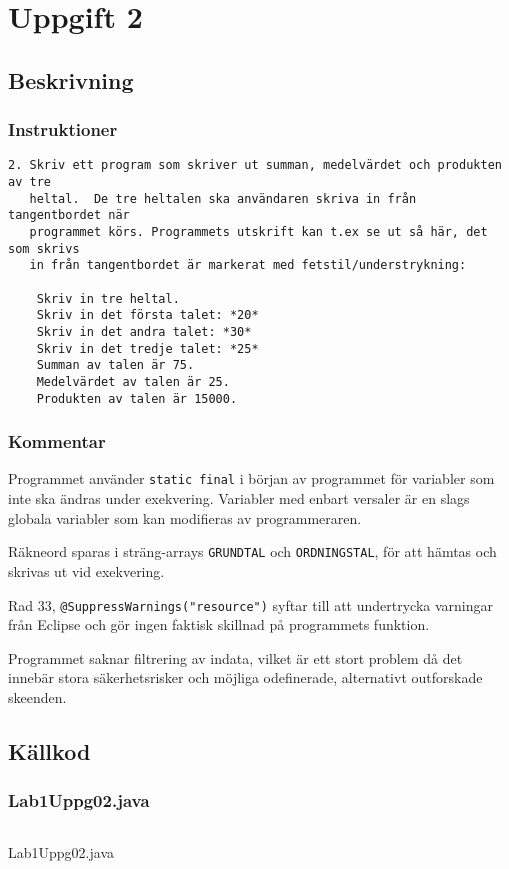 \section{Uppgift 2}\label{uppgift-2}

\subsection{Beskrivning}
\subsubsection*{Instruktioner}
\begin{verbatim}
2. Skriv ett program som skriver ut summan, medelvärdet och produkten av tre
   heltal.  De tre heltalen ska användaren skriva in från tangentbordet när
   programmet körs. Programmets utskrift kan t.ex se ut så här, det som skrivs
   in från tangentbordet är markerat med fetstil/understrykning:

    Skriv in tre heltal.
    Skriv in det första talet: *20*
    Skriv in det andra talet: *30*
    Skriv in det tredje talet: *25*
    Summan av talen är 75.
    Medelvärdet av talen är 25.
    Produkten av talen är 15000.
\end{verbatim}

\subsubsection*{Kommentar}
Programmet använder \texttt{static final} i början av programmet för variabler
som inte ska ändras under exekvering.  Variabler med enbart versaler är en
slags globala variabler som kan modifieras av programmeraren.
\par Räkneord sparas i sträng-arrays \texttt{GRUNDTAL} och
\texttt{ORDNINGSTAL}, för att hämtas och skrivas ut vid exekvering.
\par Rad 33, \texttt{@SuppressWarnings("resource")} syftar till att undertrycka
varningar från Eclipse och gör ingen faktisk skillnad på programmets funktion.
\par Programmet saknar filtrering av indata, vilket är ett stort problem då det
innebär stora säkerhetsrisker och möjliga odefinerade, alternativt outforskade
skeenden.

\subsection{Källkod}\label{uppgift-2_src}
\subsubsection*{Lab1Uppg02.java}
    \inputminted[linenos]{java}{src/Lab1Uppg02.java}
    \caption{Lab1Uppg02.java}
    \label{Uppg2src}
